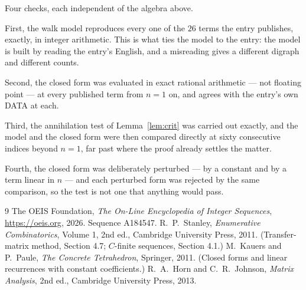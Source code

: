 \documentclass[11pt,a4paper]{article}
\theoremstyle{plain}
\theoremstyle{definition}
\begin{document}
Four checks, each independent of the algebra above.

First, the walk model reproduces every one of the $26$ terms the entry publishes,
exactly, in integer arithmetic. This is what ties the model to the entry: the model is built
by reading the entry's English, and a misreading gives a different digraph and different
counts.

Second, the closed form was evaluated in exact rational arithmetic --- not floating point ---
at every published term from $n=1$ on, and agrees with the entry's own DATA at each.

Third, the annihilation test of Lemma~\ref{lem:crit} was carried out exactly, and the model
and the closed form were then compared directly at sixty consecutive indices beyond
$n=1$, far past where the proof already settles the matter.

Fourth, the closed form was deliberately perturbed --- by a constant and by a term linear in
$n$ --- and each perturbed form was rejected by the same comparison, so the test is not one
that anything would pass.

\begin{thebibliography}{9}
 The OEIS Foundation, \emph{The On-Line Encyclopedia of Integer
Sequences}, \url{https://oeis.org}, 2026. Sequence A184547.
 R.~P.~Stanley, \emph{Enumerative Combinatorics}, Volume 1, 2nd ed.,
Cambridge University Press, 2011. (Transfer-matrix method, Section 4.7; $C$-finite sequences,
Section 4.1.)
 M.~Kauers and P.~Paule, \emph{The Concrete Tetrahedron}, Springer, 2011.
(Closed forms and linear recurrences with constant coefficients.)
 R.~A.~Horn and C.~R.~Johnson, \emph{Matrix Analysis}, 2nd ed., Cambridge
University Press, 2013.
\end{thebibliography}
\end{document}
